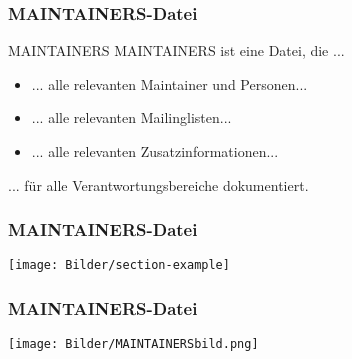 \documentclass{beamer}
\begin{document}


	\begin{frame}
	\frametitle{MAINTAINERS-Datei}
		\begin{block}{MAINTAINERS}
			MAINTAINERS ist eine Datei, die ...
			\begin{itemize}
				\item ... alle relevanten Maintainer und Personen...
				\item ... alle relevanten Mailinglisten...
				\item ... alle relevanten Zusatzinformationen...
			\end{itemize}
			... für alle Verantwortungsbereiche dokumentiert.

		\end{block}
	\end{frame}

	\begin{frame}
	\frametitle{MAINTAINERS-Datei}
	\texttt{[image: Bilder/section-example]}
	\end{frame}

	\begin{frame}
	\frametitle{MAINTAINERS-Datei}
	\texttt{[image: Bilder/MAINTAINERSbild.png]}
	\end{frame}


\end{document}
